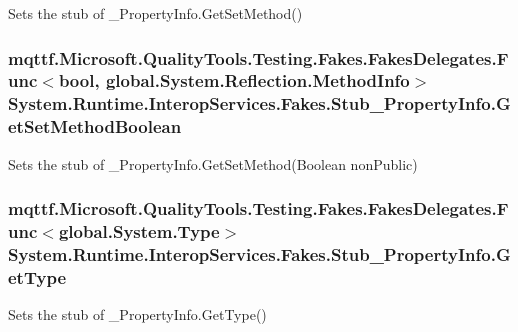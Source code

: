 Sets the stub of \-\_\-\-Property\-Info.\-Get\-Set\-Method()

\hypertarget{class_system_1_1_runtime_1_1_interop_services_1_1_fakes_1_1_stub___property_info_ad8867ee1e8d6c528ad30913c3d33eef0}{
\subsubsection[{Get\-Set\-Method\-Boolean}]{\setlength{\rightskip}{0pt plus 5cm}mqttf.\-Microsoft.\-Quality\-Tools.\-Testing.\-Fakes.\-Fakes\-Delegates.\-Func$<$bool, global.\-System.\-Reflection.\-Method\-Info$>$ System.\-Runtime.\-Interop\-Services.\-Fakes.\-Stub\-\_\-\-Property\-Info.\-Get\-Set\-Method\-Boolean}}\label{class_system_1_1_runtime_1_1_interop_services_1_1_fakes_1_1_stub___property_info_ad8867ee1e8d6c528ad30913c3d33eef0}


Sets the stub of \-\_\-\-Property\-Info.\-Get\-Set\-Method(\-Boolean non\-Public)

\hypertarget{class_system_1_1_runtime_1_1_interop_services_1_1_fakes_1_1_stub___property_info_a5eec4408c6dfdf9eeee32ba2ec8a272a}{
\subsubsection[{Get\-Type}]{\setlength{\rightskip}{0pt plus 5cm}mqttf.\-Microsoft.\-Quality\-Tools.\-Testing.\-Fakes.\-Fakes\-Delegates.\-Func$<$global.\-System.\-Type$>$ System.\-Runtime.\-Interop\-Services.\-Fakes.\-Stub\-\_\-\-Property\-Info.\-Get\-Type}}\label{class_system_1_1_runtime_1_1_interop_services_1_1_fakes_1_1_stub___property_info_a5eec4408c6dfdf9eeee32ba2ec8a272a}


Sets the stub of \-\_\-\-Property\-Info.\-Get\-Type()

